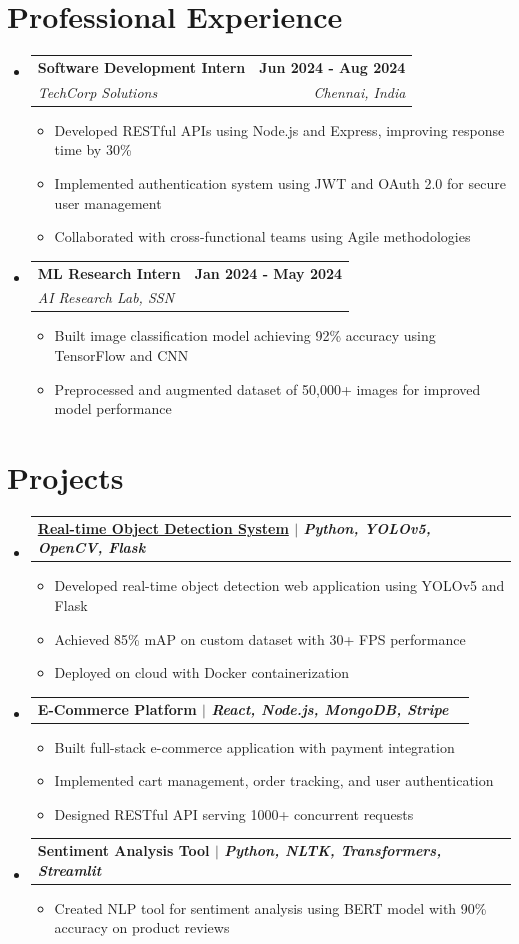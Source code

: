 \documentclass[a4paper,10pt]{article}
\makeatletter
\newcommand{\resumeItem}[1]{
  \item\small{#1 \vspace{-2pt}}
}
\newcommand{\resumeSubheading}[4]{
  \vspace{-1pt}\item
    \begin{tabular*}{0.97\textwidth}[t]{l@{\extracolsep{\fill}}r}
      \textbf{#1} & \textbf{#2} \\
      \textit{\small#3} & \textit{\small #4} \\
    \end{tabular*}\vspace{-5pt}
}
\newcommand{\resumeProjectHeading}[2]{
  \vspace{-1pt}\item
    \begin{tabular*}{0.97\textwidth}{l@{\extracolsep{\fill}}r}
      \textbf{#1} & \textit{\small#2} \\
    \end{tabular*}\vspace{-5pt}
}
\newcommand{\resumeSubHeadingListStart}{\begin{itemize}[leftmargin=0.15in, label={}]}
\newcommand{\resumeSubHeadingListEnd}{\end{itemize}}
\newcommand{\resumeItemListStart}{\begin{itemize}[leftmargin=0.2in]}
\newcommand{\resumeItemListEnd}{\end{itemize}\vspace{-5pt}}
\makeatother
\begin{document}
\section{Professional Experience}
\resumeSubHeadingListStart
  \resumeSubheading
    {Software Development Intern}{Jun 2024 - Aug 2024}
    {TechCorp Solutions}{Chennai, India}
        \resumeItemListStart
                  \resumeItem{Developed RESTful APIs using Node.js and Express, improving response time by 30\%}
            \resumeItem{Implemented authentication system using JWT and OAuth 2.0 for secure user management}
            \resumeItem{Collaborated with cross-functional teams using Agile methodologies}
                \resumeItemListEnd
          \resumeSubheading
    {ML Research Intern}{Jan 2024 - May 2024}
    {AI Research Lab, SSN}{}
        \resumeItemListStart
                  \resumeItem{Built image classification model achieving 92\% accuracy using TensorFlow and CNN}
            \resumeItem{Preprocessed and augmented dataset of 50,000+ images for improved model performance}
                \resumeItemListEnd
        \resumeSubHeadingListEnd
\vspace{4pt}

\section{Projects}
\resumeSubHeadingListStart
  \resumeProjectHeading
    {\href{https://github.com/username/project}{Real-time Object Detection System} $|$ \textit{\small Python, YOLOv5, OpenCV, Flask}}{}
        \resumeItemListStart
                  \resumeItem{Developed real-time object detection web application using YOLOv5 and Flask}
            \resumeItem{Achieved 85\% mAP on custom dataset with 30+ FPS performance}
            \resumeItem{Deployed on cloud with Docker containerization}
                \resumeItemListEnd
      \resumeProjectHeading
    {E-Commerce Platform $|$ \textit{\small React, Node.js, MongoDB, Stripe}}{}
        \resumeItemListStart
                  \resumeItem{Built full-stack e-commerce application with payment integration}
            \resumeItem{Implemented cart management, order tracking, and user authentication}
            \resumeItem{Designed RESTful API serving 1000+ concurrent requests}
                \resumeItemListEnd
      \resumeProjectHeading
    {Sentiment Analysis Tool $|$ \textit{\small Python, NLTK, Transformers, Streamlit}}{}
        \resumeItemListStart
            \resumeItem{Created NLP tool for sentiment analysis using BERT model with 90\% accuracy on product reviews}
          \resumeItemListEnd
    \resumeSubHeadingListEnd
\vspace{4pt}
\end{document}
